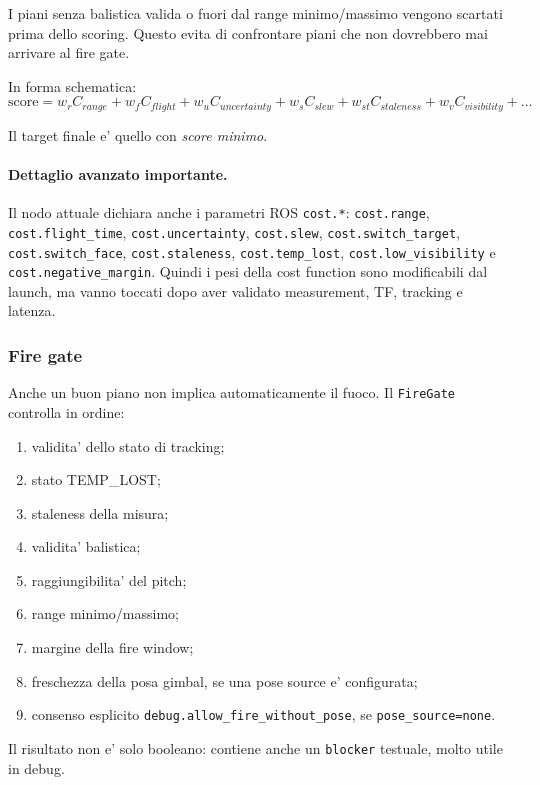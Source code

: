 \documentclass[11pt,a4paper]{article}
\newcommand{\code}[1]{\texttt{#1}}
\begin{document}
I piani senza balistica valida o fuori dal range minimo/massimo vengono scartati prima dello scoring. Questo evita di confrontare piani che non dovrebbero mai arrivare al fire gate.

In forma schematica:
\begin{equation}
  \text{score} =
  w_r C_{range} +
  w_f C_{flight} +
  w_u C_{uncertainty} +
  w_s C_{slew} +
  w_{st} C_{staleness} +
  w_v C_{visibility} + \dots
\end{equation}

Il target finale e' quello con \emph{score minimo}.

\paragraph{Dettaglio avanzato importante.}
Il nodo attuale dichiara anche i parametri ROS \code{cost.*}: \code{cost.range}, \code{cost.flight\_time}, \code{cost.uncertainty}, \code{cost.slew}, \code{cost.switch\_target}, \code{cost.switch\_face}, \code{cost.staleness}, \code{cost.temp\_lost}, \code{cost.low\_visibility} e \code{cost.negative\_margin}. Quindi i pesi della cost function sono modificabili dal launch, ma vanno toccati dopo aver validato measurement, TF, tracking e latenza.

\subsubsection{Fire gate}

Anche un buon piano non implica automaticamente il fuoco. Il \code{FireGate} controlla in ordine:
\begin{enumerate}[leftmargin=1.4em]
  \item validita' dello stato di tracking;
  \item stato TEMP\_LOST;
  \item staleness della misura;
  \item validita' balistica;
  \item raggiungibilita' del pitch;
  \item range minimo/massimo;
  \item margine della fire window;
  \item freschezza della posa gimbal, se una pose source e' configurata;
  \item consenso esplicito \code{debug.allow\_fire\_without\_pose}, se \code{pose\_source=none}.
\end{enumerate}

Il risultato non e' solo booleano: contiene anche un \code{blocker} testuale, molto utile in debug.
\end{document}
